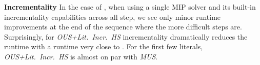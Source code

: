\textbf{Incrementality} In the case of \comus, when using a single MIP solver and its built-in incrementality capabilities across all step, we see only minor runtime improvements at the end of the sequence where the more difficult steps are. Surprisingly, for \emph{OUS+Lit.~Incr.~HS} incrementality dramatically reduces the runtime with a runtime very close to \comus. For the first few literals, \emph{OUS+Lit.~Incr.~HS} is almost on par with \emph{MUS}.




% 

